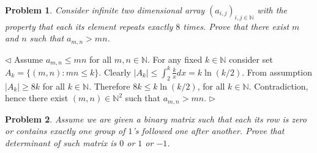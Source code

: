 \documentclass[12pt]{article}
\newtheorem{problem}{Problem}[subsection]
\newenvironment{solution}{\par $\triangleleft$}{$\triangleright$}
\begin{document}
\begin{problem} Consider infinite two dimensional array $(a_{i,j})_{i,j\in\mathbb{N}}$ with the property that each its element repeats exactly $8$ times. Prove that there exist $m$ and $n$ such that $a_{m,n}> mn$.
\end{problem}
\begin{solution} Assume $a_{m,n}\leq mn$ for all $m,n\in\mathbb{N}$. For any fixed $k\in\mathbb{N}$  consider set $A_k=\{(m,n):mn\leq k\}$. Clearly $|A_k|\leq \int_2^k \frac{k}{x}dx=k\ln(k/2)$. From assumption $|A_k|\geq 8k$ for all $k\in\mathbb{N}$. Therefore $8k\leq k\ln(k/2)$, for all $k\in\mathbb{N}$. Contradiction, hence there exist $(m,n)\in\mathbb{N}^2$ such that $a_{m,n}>mn$.
\end{solution}
 
\begin{problem} Assume we are given a binary matrix such that each its row is zero or contains exactly one group of $1$'s followed one after another. Prove that determinant of such matrix is $0$ or $1$ or $-1$.
\end{problem}
\end{document}

